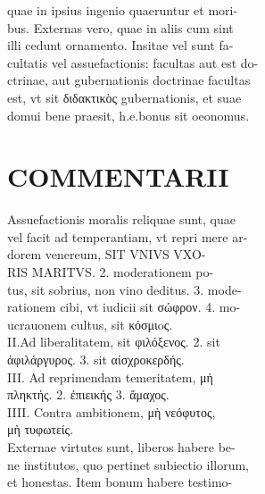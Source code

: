 \documentclass{article}
\begin{document}
\begin{pages}
                quae in ipsius ingenio quaeruntur et mori- \\
                bus. Externas vero, quae in aliis cum sint \\
                illi cedunt ornamento. Insitae vel sunt fa- \\
                cultatis vel assuefactionis: facultas aut est do- \\
                ctrinae, aut gubernationis doctrinae facultas \\
                est, vt sit διδακτικὸς gubernationis, et suae \\
                domui bene praesit, h.e.bonus sit oeonomus. \\
                
\section*{COMMENTARII \\
                }Assuefactionis moralis reliquae sunt, quae \\
                vel facit ad temperantiam, vt repri mere ar- \\
                dorem venereum, SIT VNIVS VXO- \\
                RIS MARITVS. 2. moderationem po- \\
                tus, sit sobrius, non vino deditus. 3. mode- \\
                rationem cibi, vt iudicii sit σώφρον. 4. mo- \\
                ucrauonem cultus, sit κόσμιoς. \\
                II.Ad liberalitatem, sit φιλόξενος. 2. sit \\
                ἀφιλάργυρος. 3. sit αἰσχροκερδής. \\
                III. Ad reprimendam temeritatem, μἡ \\
                πληκτής. 2. ἐπιεικής 3. ἄμαχος. \\
                IIII. Contra ambitionem, μὴ νεόφυτος, \\
                μὴ τυφωτείς. \\
                Externae virtutes sunt, liberos habere be- \\
                ne institutos, quo pertinet subiectio illorum, \\
                et honestas. Item bonum habere testimo- \\

\end{pages}
\end{document}
